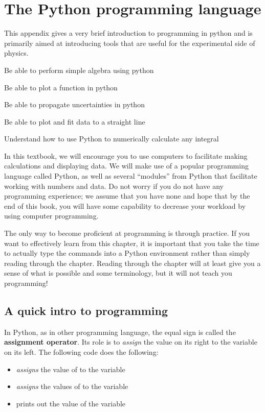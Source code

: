 \chapter{The Python programming language}
\label{chap:app:python}
This appendix gives a very brief introduction to programming in python and is primarily aimed at introducing tools that are useful for the experimental side of physics. 
 \vspace{1cm}
\begin{learningObjectives}
\item Be able to perform simple algebra using python
\item Be able to plot a function in python
\item Be able to propagate uncertainties in python
\item Be able to plot and fit data to a straight line
\item Understand how to use Python to numerically calculate any integral
\end{learningObjectives}

In this textbook, we will encourage you to use computers to facilitate making calculations and displaying data. We will make use of a popular programming language called Python, as well as several ``modules'' from Python that facilitate working with numbers and data. Do not worry if you do not have any programming experience; we assume that you have none and hope that by the end of this book, you will have some capability to decrease your workload by using computer programming.

The only way to become proficient at programming is through practice. If you want to effectively learn from this chapter, it is important that you take the time to actually type the commands into a Python environment rather than simply reading through the chapter. Reading through the chapter will at least give you a sense of what is possible and some terminology, but it will not teach you programming!

\section{A quick intro to programming}
In Python, as in other programming language, the equal sign is called the \textbf{assignment operator}. Its role is to \textit{assign} the value on its right to the variable on its left. The following code does the following:
\begin{itemize}
\item \textit{assigns} the value of  to the variable 
\item \textit{assigns} the values of  to the variable 
\item prints out the value of the variable 
\end{itemize}

